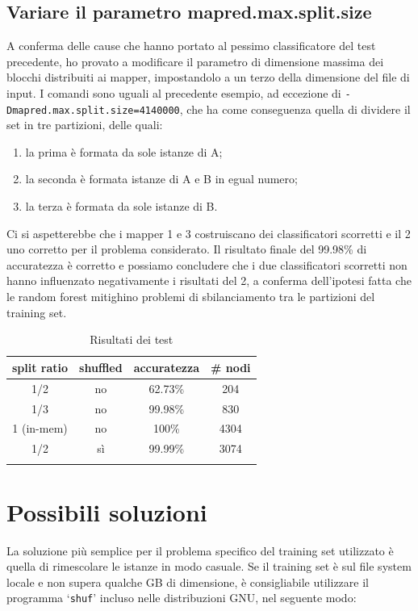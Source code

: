 \documentclass[a4paper,11pt,twoside,openright,fleqn]{book}
\newcommand{\code}[1]{\texttt{#1}}
\begin{document}
\subsection{Variare il parametro mapred.max.split.size}

A conferma delle cause che hanno portato al pessimo classificatore del test precedente, ho provato a modificare il parametro di dimensione massima dei blocchi distribuiti ai mapper, impostandolo a un terzo della dimensione del file di input. I comandi sono uguali al precedente esempio, ad eccezione di \code{-Dmapred.max.split.size=4140000}, che ha come conseguenza quella di dividere il set in tre partizioni, delle quali:
\begin{enumerate}
\item la prima è formata da sole istanze di A;
\item la seconda è formata istanze di A e B in egual numero;
\item la terza è formata da sole istanze di B.
\end{enumerate}

Ci si aspetterebbe che i mapper 1 e 3 costruiscano dei classificatori scorretti e il 2 uno corretto per il problema considerato. Il risultato finale del 99.98\% di accuratezza è corretto e possiamo concludere che i due classificatori scorretti non hanno influenzato negativamente i risultati del 2, a conferma dell'ipotesi fatta che le random forest mitighino problemi di sbilanciamento tra le partizioni del training set.

\begin{table}[htbp]
\centering
\begin{tabular}{cccc}
\firsthline
\bfseries split ratio & \bfseries shuffled & \bfseries accuratezza & \bfseries \# nodi \\ \hline
1/2 & no & 62.73\% & 204 \\
1/3 & no & 99.98\% & 830 \\
1 (in-mem) & no & 100\% & 4304 \\
1/2 & sì & 99.99\% & 3074 \\
\lasthline
\end{tabular}
\caption{Risultati dei test} \label{tab:risultati}
\end{table}

\section{Possibili soluzioni}

La soluzione più semplice per il problema specifico del training set utilizzato è quella di rimescolare le istanze in modo casuale. Se il training set è sul file system locale e non supera qualche GB di dimensione, è consigliabile utilizzare il programma `\code{shuf}' incluso nelle distribuzioni GNU, nel seguente modo:
\end{document}
